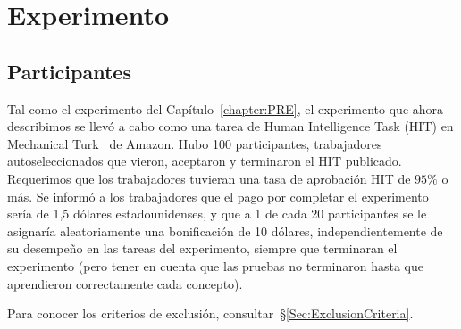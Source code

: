 
\section{Experimento}\label{Section:Experiment}

\subsection{Participantes} \label{Participants}

Tal como el experimento del Capítulo~\ref{chapter:PRE}, el experimento que ahora describimos se llevó a cabo como una tarea de Human Intelligence Task (HIT) en Mechanical Turk~\cite{crump2013evaluating, buhrmester2011amazon, stewart2015average} de Amazon. Hubo 100 participantes, trabajadores autoseleccionados que vieron, aceptaron y terminaron el HIT publicado. Requerimos que los trabajadores tuvieran una tasa de aprobación HIT de $95 \%$ o más. Se informó a los trabajadores que el pago por completar el experimento sería de {1,5} dólares estadounidenses,
y que a 1 de cada 20 participantes se le asignaría aleatoriamente una bonificación de 10 dólares, independientemente de su desempeño en las tareas del experimento, siempre que terminaran el experimento (pero tener en cuenta que las pruebas no terminaron hasta que aprendieron correctamente cada concepto).

Para conocer los criterios de exclusión, consultar~\S\ref{Sec:ExclusionCriteria}.


